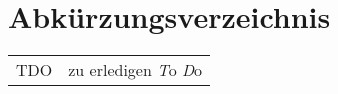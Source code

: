 
\cleardoublepage
{}
{}
\chapter*{Abkürzungsverzeichnis}
\label{section-abbrevs}

\begin{tabularx}{\textwidth}{lX}
  TDO & zu erledigen \emph{T}o \emph{D}o\\

\end{tabularx}
